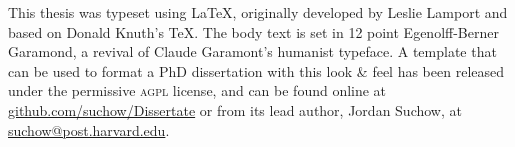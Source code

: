 This thesis was typeset using \LaTeX, originally developed by Leslie Lamport and based on Donald Knuth's \TeX. The body text is set in 12 point Egenolff-Berner Garamond, a revival of Claude Garamont's humanist typeface. A template that can be used to format a PhD dissertation with this look \& feel has been released under the permissive \textsc{agpl} license, and can be found online at \href{https://github.com/suchow/Dissertate}{github.com/suchow/Dissertate} or from its lead author, Jordan Suchow, at \href{mailto:suchow@post.harvard.edu}{suchow@post.harvard.edu}.